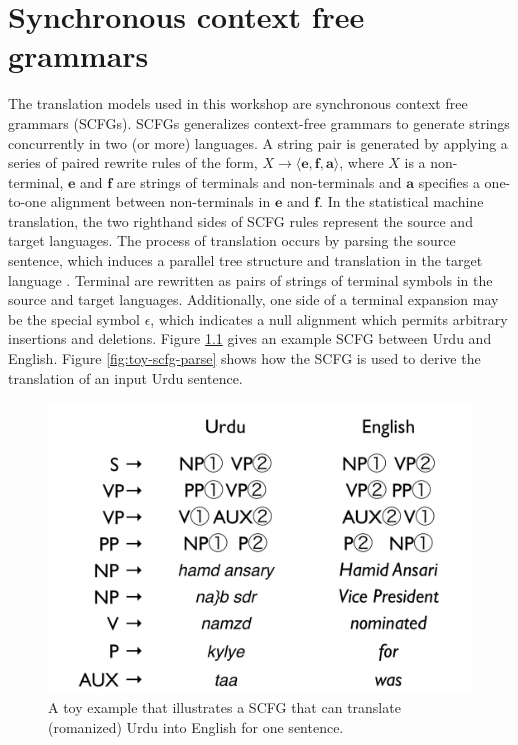
\chapter{Synchronous context free grammars} \label{sec:scfg}


The translation models used in this workshop are synchronous context free grammars (SCFGs).
SCFGs \cite{lewis68scfg} generalizes context-free grammars to generate strings concurrently in two (or more) languages. A string pair is generated by applying a series of paired rewrite rules of the form, $X \rightarrow \langle \mathbf{e}, \mathbf{f}, \mathbf{a} \rangle$, where $X$ is a non-terminal, $\mathbf{e}$ and $\mathbf{f}$ are strings of terminals and non-terminals and $\mathbf{a}$ specifies a one-to-one alignment between non-terminals in $\mathbf{e}$ and $\mathbf{f}$.
In the statistical machine translation, the two righthand sides of SCFG rules represent the source and target languages.  The process of translation occurs by parsing the source sentence, which induces a parallel tree structure and translation in the target language \cite{chiang07hierarchical}.  
Terminal are rewritten as pairs of strings of terminal symbols in the source and target languages.  Additionally, one side of a terminal expansion may be the special symbol $\epsilon$, which indicates a null alignment which permits arbitrary insertions and deletions.
Figure \ref{fig:toy-scfg} gives an example SCFG between Urdu and English.  Figure \ref{fig:toy-scfg-parse} shows how the SCFG is used to derive the translation of an input Urdu sentence.




\begin{figure}
\begin{center}
\includegraphics[width=.6\linewidth]{SCFGs/example-scfg}
\end{center}
\caption{A toy example that illustrates a SCFG that can translate (romanized) Urdu into English for one sentence.    }\label{fig:toy-scfg} 
\end{figure}



